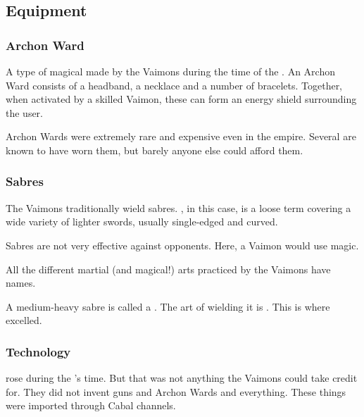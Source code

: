 \subsection{Equipment}





\subsubsection{Archon Ward}
A type of magical \armour made by the Vaimons during the time of the . An Archon Ward consists of a headband, a necklace and a number of bracelets. Together, when activated by a skilled Vaimon, these can form an energy shield surrounding the user. 

Archon Wards were extremely rare and expensive even in the empire. Several \VaimonCaliphs are known to have worn them, but barely anyone else could afford them. 





\subsubsection{Sabres}
The Vaimons traditionally wield sabres. 
, in this case, is a loose term covering a wide variety of lighter swords, usually single-edged and curved. 

Sabres are not very effective against \armoured opponents. 
Here, a Vaimon would use magic. 

All the different martial (and magical!) arts practiced by the Vaimons have names. 

A medium-heavy sabre is called a \chandre. 
The art of wielding it is \chatresse. 
This is where \VizicarDurasRespina{} excelled. 





\subsubsection{Technology}
 rose during the \VaimonCaliphate's time. 
But that was not anything the Vaimons could take credit for. 
They did not invent guns and Archon Wards and everything. 
These things were imported through Cabal channels. 





